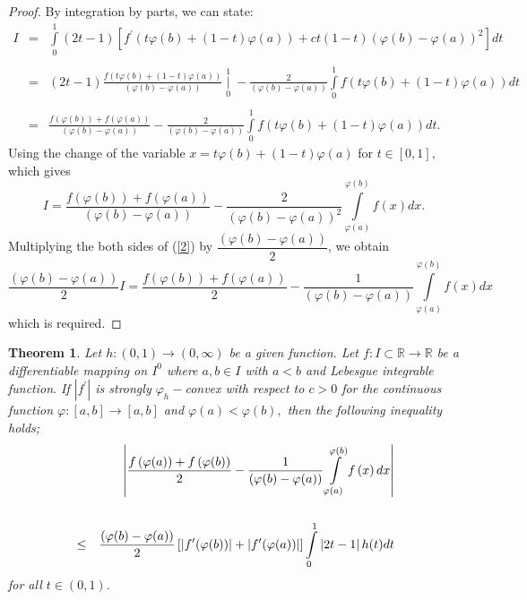 \documentclass{amsart}
\newtheorem{theorem}{Theorem}
\theoremstyle{plain}
\numberwithin{equation}{section}
\begin{document}
\begin{proof}
By integration by parts, we can state:\begin{eqnarray*}
I &=&\int\limits_{0}^{1}(2t-1)\left[ f^{\prime }\left( t\varphi (b)+\left(
1-t\right) \varphi (a)\right) +ct(1-t)(\varphi (b)-\varphi (a))^{2}\right] dt
\\
&& \\
&=&(2t-1)\frac{f\left( t\varphi (b)+\left( 1-t\right) \varphi (a)\right) }{(\varphi (b)-\varphi (a))}\underset{0}{\overset{1}{\mid }}-\frac{2}{(\varphi
(b)-\varphi (a))}\int\limits_{0}^{1}f\left( t\varphi (b)+\left( 1-t\right)
\varphi (a)\right) dt \\
&& \\
&=&\frac{f\left( \varphi (b)\right) +f\left( \varphi (a)\right) }{(\varphi
(b)-\varphi (a))}-\frac{2}{(\varphi (b)-\varphi (a))}\int\limits_{0}^{1}f\left( t\varphi (b)+\left( 1-t\right) \varphi (a)\right) dt.
\end{eqnarray*}Using the change of the variable $x=t\varphi (b)+\left( 1-t\right) \varphi
(a)$ for $t\in \left[ 0,1\right] ,$ which gives\begin{equation}
I=\frac{f\left( \varphi (b)\right) +f\left( \varphi (a)\right) }{(\varphi
(b)-\varphi (a))}-\frac{2}{(\varphi (b)-\varphi (a))^{2}}\int\limits_{\varphi (a)}^{\varphi (b)}f\left( x\right) dx.  \label{2}
\end{equation}Multiplying the both sides of (\ref{2}) by $\dfrac{(\varphi (b)-\varphi (a))}{2}$, we obtain\begin{equation*}
\dfrac{(\varphi (b)-\varphi (a))}{2}I=\frac{f\left( \varphi (b)\right)
+f\left( \varphi (a)\right) }{2}-\frac{1}{(\varphi (b)-\varphi (a))}\int\limits_{\varphi (a)}^{\varphi (b)}f\left( x\right) dx
\end{equation*}which is required.
\end{proof}

\begin{theorem}
\label{t1} Let $h:\left( 0,1\right) \rightarrow \left( 0,\infty \right) $ be
a given function. Let $f:I\subset 
\mathbb{R}
\rightarrow 
\mathbb{R}
$ be a differentiable mapping on $I^{0}$ where $a,b\in I$ with $a<b$ and
Lebesgue integrable function$.$ If $\left\vert f^{\prime }\right\vert $ is
strongly $\varphi _{h}-$convex with respect to $c>0$ for the continuous
function $\varphi :\left[ a,b\right] \rightarrow \left[ a,b\right] $ and $\varphi (a)<\varphi (b),$ then the following inequality holds;\begin{eqnarray}
&&\left\vert \frac{f\left( \varphi (a)\right) +f\left( \varphi (b)\right) }{2}-\frac{1}{(\varphi (b)-\varphi (a))}\int\limits_{\varphi (a)}^{\varphi
(b)}f\left( x\right) dx\right\vert   \label{s2} \\
&&  \notag \\
&\leq &\dfrac{(\varphi (b)-\varphi (a))}{2}\left[ \left\vert f^{\prime
}(\varphi (b))\right\vert +\left\vert f^{\prime }(\varphi (a))\right\vert \right] \int\limits_{0}^{1}\left\vert 2t-1\right\vert h(t)dt  \notag
\end{eqnarray}for all $t\in \left( 0,1\right) .$
\end{theorem}
\end{document}
